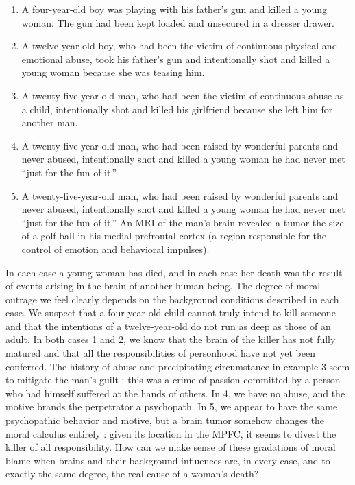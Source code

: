 \documentclass[a4paper,14pt]{extarticle}
\begin{document}
\begin{enumerate}
      \item
            A four-year-old boy was playing with his father’s gun and killed a young woman.
            The gun had been kept loaded and unsecured in a dresser drawer.

      \item
            A twelve-year-old boy, who had been the victim of continuous physical and emotional abuse, took his father’s gun and intentionally shot and killed a young woman because she was teasing him.

      \item
            A twenty-five-year-old man, who had been the victim of continuous abuse as a child, intentionally shot and killed his girlfriend because she left him for another man.

      \item
            A twenty-five-year-old man, who had been raised by wonderful parents and never abused, intentionally shot and killed a young woman he had never met ``just for the fun of it.''

      \item
            A twenty-five-year-old man, who had been raised by wonderful parents and never abused, intentionally shot and killed a young woman he had never met ``just for the fun of it.''
            An MRI of the man’s brain revealed a tumor the size of a golf ball in his medial prefrontal cortex (a region responsible for the control of emotion and behavioral impulses).

\end{enumerate}

In each case a young woman has died, and in each case her death was the result of events arising in the brain of another human being.
The degree of moral outrage we feel clearly depends on the background conditions described in each case.
We suspect that a four-year-old child cannot truly intend to kill someone and that the intentions of a twelve-year-old do not run as deep as those of an adult.
In both cases 1 and 2, we know that the brain of the killer has not fully matured and that all the responsibilities of personhood have not yet been conferred.
The history of abuse and precipitating circumstance in example 3 seem to mitigate the man’s guilt :
this was a crime of passion committed by a person who had himself suffered at the hands of others.
In 4, we have no abuse, and the motive brands the perpetrator a psychopath.
In 5, we appear to have the same psychopathic behavior and motive, but a brain tumor somehow changes the moral calculus entirely :
given its location in the MPFC, it seems to divest the killer of all responsibility.
How can we make sense of these gradations of moral blame when brains and their background influences are, in every case, and to exactly the same degree, the real cause of a woman’s death?
\end{document}
